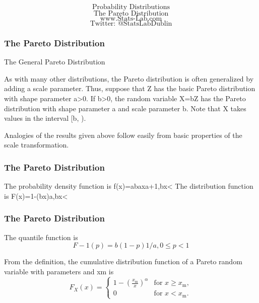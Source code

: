 

\begin{frame}
\huge
\[ \mbox{Probability Distributions}\]
\[ \mbox{The Pareto Distribution}  \]
\Large
\[ \mbox{www.Stats-Lab.com}  \]
\[ \mbox{Twitter: @StatsLabDublin}  \]

\end{frame}

\begin{frame}

\frametitle{The Pareto Distribution}




The General Pareto Distribution

As with many other distributions, the Pareto distribution is often generalized by adding a scale parameter. Thus, suppose that Z has the basic Pareto distribution with shape parameter a>0. If b>0, the random variable X=bZ has the Pareto distribution with shape parameter a and scale parameter b. Note that X takes values in the interval [b, \infty).

Analogies of the results given above follow easily from basic properties of the scale transformation.

\end{frame}

\begin{frame}
\frametitle{The Pareto Distribution}

The probability density function is
f(x)=abaxa+1,b\leq x< \infty
The distribution function is
F(x)=1-(bx)a,b\leq x< \infty
\end{frame}

\begin{frame}
\frametitle{The Pareto Distribution}



The quantile function is
\[F-1(p)=b(1-p)1/a,0\leq p<1\]


\end{frame}

\begin{frame}
\begin{itemize}

From the definition, the cumulative distribution function of a Pareto random variable with parameters \alpha and xm is
\[F_X(x) = \begin{cases}
1-\left(\frac{x_\mathrm{m}}{x}\right)^\alpha & \text{for } x \ge x_\mathrm{m}, \\
0 & \text{for }x < x_\mathrm{m}.
\end{cases}
\]
\end{itemize}
\end{frame}

